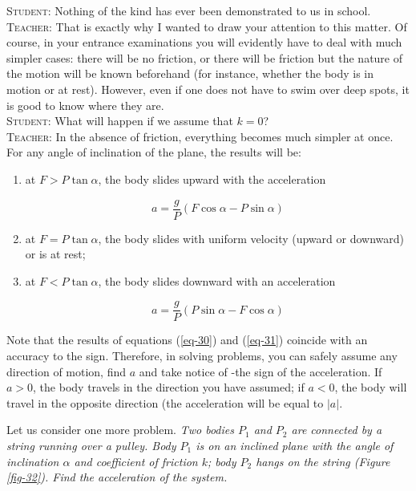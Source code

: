 \documentclass[a4paper,sfsidenotes]{tufte-book}
\begin{document}
\textsc{Student:} Nothing of the kind has ever been demonstrated to us in school. 
\\
\textsc{Teacher:} That is exactly why I wanted to draw your attention to this matter. Of course, in your entrance examinations you will evidently have to deal with much simpler cases: there will be no friction, or there will be friction but the nature of the motion will be known beforehand (for instance, whether the body is in motion or at rest). However, even if one does not have to swim over deep spots, it is good to know where they are.
\\
\textsc{Student:} What will happen if we assume that $k=0$?
\\
\textsc{Teacher:} In the absence of friction, everything becomes much simpler at once. For any angle of inclination of the plane, the results will be: 
\begin{enumerate}[label=$\blacktriangleright$,leftmargin=1cm]
\item at $F > P \tan \alpha$, the body slides upward with the acceleration 

\begin{equation}
a = \frac{g}{P} \left( F \cos \alpha -P \sin \alpha \right)
\label{eq-30}
\end{equation}

\item at $F = P \tan \alpha$, the body slides with uniform velocity (upward or downward) or is at rest;

\item at $F < P \tan \alpha$, the body slides downward with an acceleration

\begin{equation}
a = \frac{g}{P} \left( P \sin \alpha - F \cos \alpha \right)
\label{eq-31}
\end{equation}

\end{enumerate}
Note that the results of equations (\ref{eq-30}) and (\ref{eq-31}) coincide with an accuracy to the sign. Therefore, in solving problems, you can safely assume any direction of motion, find $a$ and take
notice of -the sign of the acceleration. If $a>0$, the body travels in the direction you have assumed; if $a<0$, the body will travel in the opposite direction (the acceleration will be equal to $|a|$.

Let us consider one more problem. \emph{Two bodies $P_{1}$ and $P_{2}$ are connected by a string running over a pulley. Body $P_{1}$ is on an inclined plane with the angle of inclination $\alpha$ and coefficient of friction $k$; body $P_{2}$ hangs on the string (\emph{Figure \ref{fig-32}}). Find the acceleration of the system.}
\end{document}

